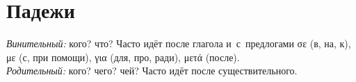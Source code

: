 \documentclass[12pt]{article}
\newenvironment{page}{\clearpage\normalsize\null\vfill}{\vfill\null}
\newenvironment{textblock}{\begin{minipage}{\textwidth}}{\end{minipage}\smallskip}
\begin{document}
    \begin{page}
        \section{Падежи}
        \begin{textblock}
            \tiny
            \emph{Винительный:} кого? что? Часто идёт после глагола и~с~предлогами
            σε (в, на, к),
            με (с, при помощи),
            για (для, про, ради),
            μετά (после).\\
            \emph{Родительный:} кого? чего? чей? Часто идёт после существительного.
        \end{textblock}
        \smallskip


\end{page}
\end{document}
